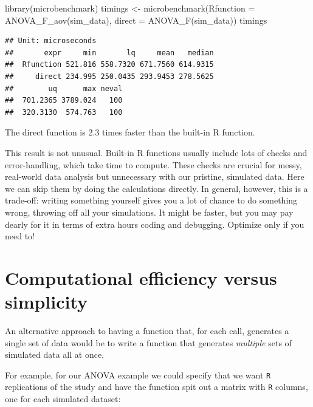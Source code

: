 \documentclass[
]{book}
\newenvironment{Shaded}{\begin{snugshade}}{\end{snugshade}}
\newcommand{\AttributeTok}[1]{\textcolor[rgb]{0.77,0.63,0.00}{#1}}
\newcommand{\FunctionTok}[1]{\textcolor[rgb]{0.00,0.00,0.00}{#1}}
\newcommand{\NormalTok}[1]{#1}
\newcommand{\OtherTok}[1]{\textcolor[rgb]{0.56,0.35,0.01}{#1}}
\begin{document}
\begin{Shaded}
\begin{Highlighting}[]
\FunctionTok{library}\NormalTok{(microbenchmark)}
\NormalTok{timings }\OtherTok{\textless{}{-}} \FunctionTok{microbenchmark}\NormalTok{(}\AttributeTok{Rfunction =} \FunctionTok{ANOVA\_F\_aov}\NormalTok{(sim\_data),}
                          \AttributeTok{direct    =} \FunctionTok{ANOVA\_F}\NormalTok{(sim\_data))}
\NormalTok{timings}
\end{Highlighting}
\end{Shaded}

\begin{verbatim}
## Unit: microseconds
##       expr     min       lq     mean   median
##  Rfunction 521.816 558.7320 671.7560 614.9315
##     direct 234.995 250.0435 293.9453 278.5625
##        uq      max neval
##  701.2365 3789.024   100
##  320.3130  574.763   100
\end{verbatim}

The direct function is 2.3 times faster than the built-in R function.

This result is not unusual.
Built-in R functions usually include lots of checks and error-handling, which take time to compute. These checks are crucial for messy, real-world data analysis but unnecessary with our pristine, simulated data.
Here we can skip them by doing the calculations directly.
In general, however, this is a trade-off: writing something yourself gives you a lot of chance to do something wrong, throwing off all your simulations. It might be faster, but you may pay dearly for it in terms of extra hours coding and debugging.
Optimize only if you need to!

\hypertarget{sec_comp_efficiency}{%
\section{Computational efficiency versus simplicity}\label{sec_comp_efficiency}}

An alternative approach to having a function that, for each call, generates a single set of data would be to write a function that generates \emph{multiple} sets of simulated data all at once.

For example, for our ANOVA example we could specify that we want \texttt{R} replications of the study and have the function spit out a matrix with \texttt{R} columns, one for each simulated dataset:
\end{document}
